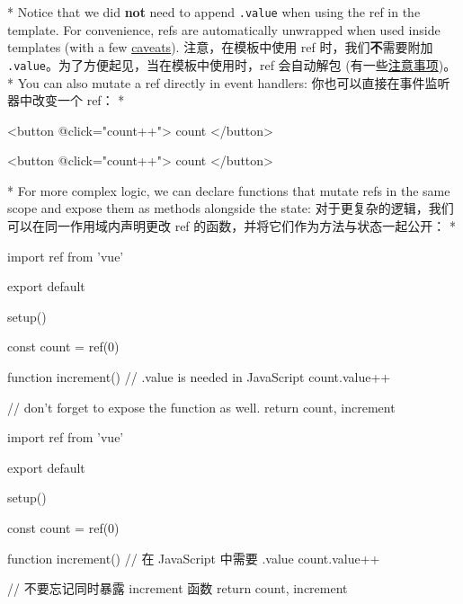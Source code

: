 \begin{paracol}{2}
\switchcolumn[0]*%
Notice that we did \textbf{not} need to append \texttt{.value} when
using the ref in the template. For convenience, refs are automatically
unwrapped when used inside templates (with a few
\href{https://vuejs.org/guide/essentials/reactivity-fundamentals.html\#caveat-when-unwrapping-in-templates}{caveats}).
\switchcolumn
注意，在模板中使用 ref 时，我们\textbf{不}需要附加
\texttt{.value}。为了方便起见，当在模板中使用时，ref 会自动解包
(有一些\href{https://cn.vuejs.org/guide/essentials/reactivity-fundamentals.html\#caveat-when-unwrapping-in-templates}{注意事项})。
\switchcolumn[0]*%
You can also mutate a ref directly in event handlers:
\switchcolumn
你也可以直接在事件监听器中改变一个 ref：
\switchcolumn[0]*%
\begin{codeHtml}
<button @click="count++">
{{ count }}
</button>
\end{codeHtml}  
\switchcolumn
\begin{codeHtml}
<button @click="count++">
{{ count }}
</button>
\end{codeHtml}  

\switchcolumn[0]*%
For more complex logic, we can declare functions that mutate refs in the
same scope and expose them as methods alongside the state:
\switchcolumn
对于更复杂的逻辑，我们可以在同一作用域内声明更改 ref
的函数，并将它们作为方法与状态一起公开：
\switchcolumn[0]*%
\begin{codeJs}
import { ref } from 'vue'

export default {
    setup() {
    const count = ref(0)

    function increment() {
        // .value is needed in JavaScript
        count.value++
    }

    // don't forget to expose the function as well.
    return {
        count,
        increment
    }
    }
}
\end{codeJs}
\switchcolumn
\begin{codeJs}
import { ref } from 'vue'

export default {
    setup() {
    const count = ref(0)

    function increment() {
        // 在 JavaScript 中需要 .value
        count.value++
    }

    // 不要忘记同时暴露 increment 函数
    return {
        count,
        increment
    }
    }
}
\end{codeJs}

\end{paracol}



